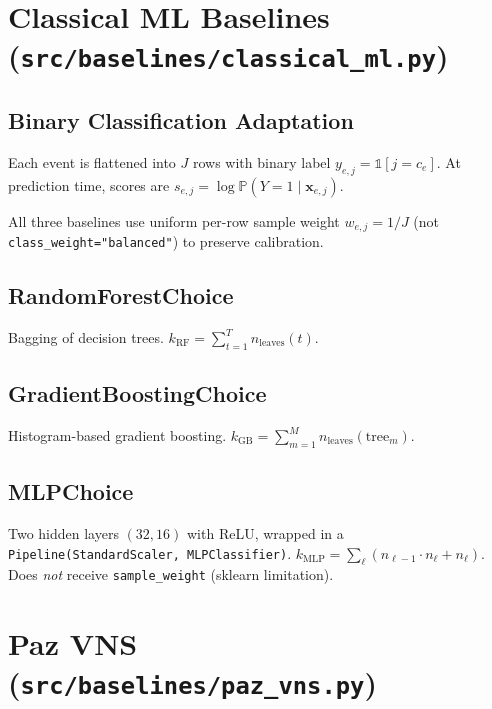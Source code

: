 \documentclass[11pt,a4paper]{article}
\begin{document}
\section{Classical ML Baselines (\texttt{src/baselines/classical\_ml.py})}
\label{sec:classical-ml}

\subsection{Binary Classification Adaptation}

Each event is flattened into $J$ rows with binary label $y_{e,j} = \mathbb{1}[j = c_e]$.  At prediction time, scores are $s_{e,j} = \log \mathbb{P}(Y = 1 \mid \mathbf{x}_{e,j})$.

All three baselines use uniform per-row sample weight $w_{e,j} = 1/J$ (not \texttt{class\_weight="balanced"}) to preserve calibration.

\subsection{RandomForestChoice}
Bagging of decision trees.  $k_{\text{RF}} = \sum_{t=1}^{T} n_{\text{leaves}}(t)$.

\subsection{GradientBoostingChoice}
Histogram-based gradient boosting.  $k_{\text{GB}} = \sum_{m=1}^{M} n_{\text{leaves}}(\text{tree}_m)$.

\subsection{MLPChoice}
Two hidden layers $(32, 16)$ with ReLU, wrapped in a \texttt{Pipeline(StandardScaler, MLPClassifier)}.  $k_{\text{MLP}} = \sum_\ell (n_{\ell-1} \cdot n_\ell + n_\ell)$.  Does \emph{not} receive \texttt{sample\_weight} (sklearn limitation).


\section{Paz VNS (\texttt{src/baselines/paz\_vns.py})}
\label{sec:paz-vns}
\end{document}
